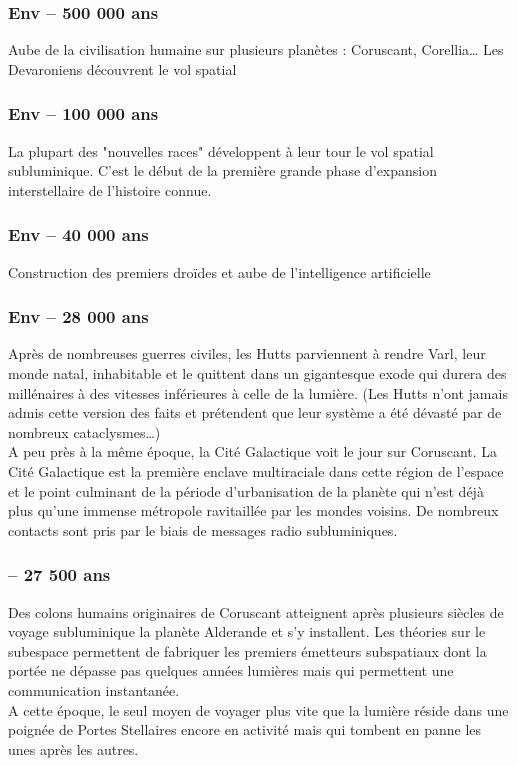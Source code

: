 \documentclass[twoside]{article}
\begin{document}
\subsubsection*{Env -- 500 000 ans}
Aube de la civilisation humaine sur plusieurs planètes : Coruscant, Corellia\ldots 
Les Devaroniens découvrent le vol spatial
\subsubsection*{Env -- 100 000  ans}
La plupart des  "nouvelles races" développent à leur tour le vol spatial subluminique. C'est le début de la première grande phase d'expansion interstellaire de l'histoire connue. 
\subsubsection*{Env -- 40 000 ans}
Construction des premiers droïdes et aube de l'intelligence artificielle 
\subsubsection*{Env -- 28 000 ans}
Après de nombreuses guerres civiles, les Hutts parviennent à rendre Varl, leur monde natal, inhabitable et le quittent dans un gigantesque exode qui durera des millénaires à des vitesses inférieures à celle de la lumière. (Les Hutts n'ont jamais admis cette version des faits et prétendent que leur système a été dévasté par de nombreux cataclysmes\ldots)\\

A peu près à la même époque, la Cité Galactique voit le jour sur Coruscant. La Cité Galactique est la première enclave multiraciale dans cette région de l'espace et le point culminant de la période d'urbanisation de la planète qui n'est déjà plus qu'une immense métropole ravitaillée par les mondes voisins. De nombreux contacts sont pris par le biais de messages radio subluminiques. 
\subsubsection*{-- 27 500 ans}
Des colons humains originaires de Coruscant atteignent après plusieurs siècles de voyage subluminique la planète Alderande et s'y installent. Les théories sur le subespace permettent de fabriquer les premiers émetteurs subspatiaux dont la portée ne dépasse pas quelques années lumières mais qui permettent une communication instantanée.\\

A cette époque, le seul moyen de voyager plus vite que la lumière réside dans une poignée de Portes Stellaires encore en activité mais qui tombent en panne les unes après les autres.
\end{document}
